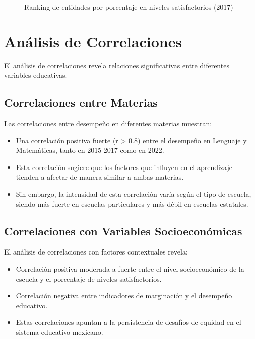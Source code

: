 \begin{figure}[h]
    \centering
    \caption{Ranking de entidades por porcentaje en niveles satisfactorios (2017)}
    \label{fig:ranking_entidades}
\end{figure}

\section{Análisis de Correlaciones}
El análisis de correlaciones revela relaciones significativas entre diferentes variables educativas.

\subsection{Correlaciones entre Materias}
Las correlaciones entre desempeño en diferentes materias muestran:

\begin{itemize}
    \item Una correlación positiva fuerte (r > 0.8) entre el desempeño en Lenguaje y Matemáticas, tanto en 2015-2017 como en 2022.
    
    \item Esta correlación sugiere que los factores que influyen en el aprendizaje tienden a afectar de manera similar a ambas materias.
    
    \item Sin embargo, la intensidad de esta correlación varía según el tipo de escuela, siendo más fuerte en escuelas particulares y más débil en escuelas estatales.
\end{itemize}

\subsection{Correlaciones con Variables Socioeconómicas}
El análisis de correlaciones con factores contextuales revela:

\begin{itemize}
    \item Correlación positiva moderada a fuerte entre el nivel socioeconómico de la escuela y el porcentaje de niveles satisfactorios.
    
    \item Correlación negativa entre indicadores de marginación y el desempeño educativo.
    
    \item Estas correlaciones apuntan a la persistencia de desafíos de equidad en el sistema educativo mexicano.
\end{itemize}

